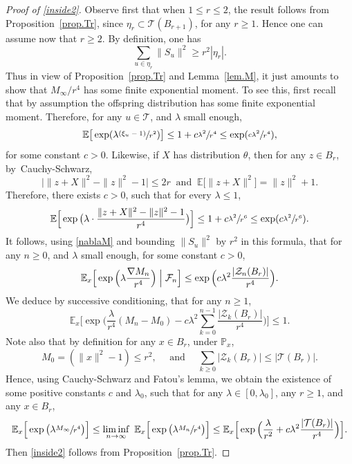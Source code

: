 \documentclass[11pt]{article}
\numberwithin{equation}{section}
\newcommand{\psfrac}[2]{\sfrac{(#1)}{#2}}
\let\ts\textstyle
\theoremstyle{plain}
\theoremstyle{definition}
\newcommand{\1}{{\text{\Large $\mathfrak 1$}}}
\begin{document}
\begin{proof}[Proof of \eqref{inside2}]
Observe first that when $1\le r\le 2$, the result follows from Proposition~\ref{prop.Tr}, since $\eta_r \subset \mathcal T(B_{r+1})$, for any $r\ge 1$. Hence one can assume now that $r\ge 2$.
By definition, one has
\[
\sum_{u\in \eta_r}\|S_u\|^2\ge r^2
|\eta_r|.
\]
Thus in view of Proposition~\ref{prop.Tr} and Lemma~\ref{lem.M},
it just amounts to show that $M_\infty/r^4$ has some finite exponential moment. To see this, first recall that by assumption the offspring distribution has some finite
exponential moment. Therefore, for any $u\in \mathbf {\mathcal T}$,
and $\lambda$ small enough,
\[
\mathbb E \big[\exp(\lambda \psfrac{\xi_u - 1}{r^2})\big] \le 1+ c\sfrac{\lambda^2}{r^4} \le \exp(\sfrac{c\lambda^2}{r^4}),
\]
for some constant $c>0$. Likewise, if $X$ has distribution $\theta$, then for any $z\in B_r$, by~Cauchy-Schwarz,
\[
\big|\|z+X\|^2 - \|z\|^2 - 1\big| \le 2r \ \text{ and }\ \mathbb E\big[\|z+X\|^2\big] = \|z\|^2 + 1.
\]
Therefore, there exists $c>0$, such that for every $\lambda\le 1$,
\[
\mathbb E \Big[\exp\big(\lambda\cdot \frac{\|z+X\|^2 - \|z\|^2 - 1}{r^4}\big)\Big] \le 1+ c\sfrac{\lambda^2}{r^6} \le \exp(c\sfrac{\lambda^2}{r^6}).
\]
It follows, using \eqref{nablaM} and bounding $\|S_u\|^2$ by $r^2$ in this formula,
that for any $n\ge 0$, and $\lambda$ small enough, for some constant $c>0$,
\[
\mathbb E_x\Big[\exp\Big(\lambda \frac{\nabla M_n}{r^4}\Big)
\Bigm|\mathcal F_n\Big] \le \exp\Big(c\lambda^2
\frac{|\mathcal Z_n(B_r)|}{r^4}\Big).
\]
We deduce by successive conditioning, that for any $n\ge 1$,
\[
\mathbb E_x\Big[\exp\Big(\frac{\lambda}{r^4}(M_n - M_0)
- c\lambda^2 {\ts\sum_{k= 0}^{n-1}} \frac{|\mathcal Z_k(B_r)|}{r^4}\Big)\Big] \le 1.
\]
Note also that by definition for any $x\in B_r$, under $\mathbb P_x$,
\[
M_0= (\|x\|^2-1) \le r^2,\quad
\text{ and }\quad \sum_{k\ge 0} |\mathcal Z_k(B_r)|\le |\mathcal T(B_r)|.
\]
Hence, using Cauchy-Schwarz and Fatou's lemma, we obtain the existence of some positive constants $c$ and $\lambda_0$, such that for any $\lambda\in[0,\lambda_0]$, any $r\ge 1$, and any $x\in B_r$,
\[
\mathbb E_x\Big[\exp\big(\lambda\sfrac{M_\infty}{r^4}\big)\Big]
\le \liminf_{n\to \infty} \ \mathbb E_x\Big[\exp\big(\lambda\sfrac{M_n}{r^4}\big)\Big]
\le \mathbb E_x\Big[\exp\Big(\frac{\lambda}{r^2}+
c\lambda^2\frac{|\mathcal T(B_r)|}{r^4}\Big)\Big].
\]
Then \eqref{inside2} follows from Proposition~\ref{prop.Tr}.
\end{proof}
\end{document}
